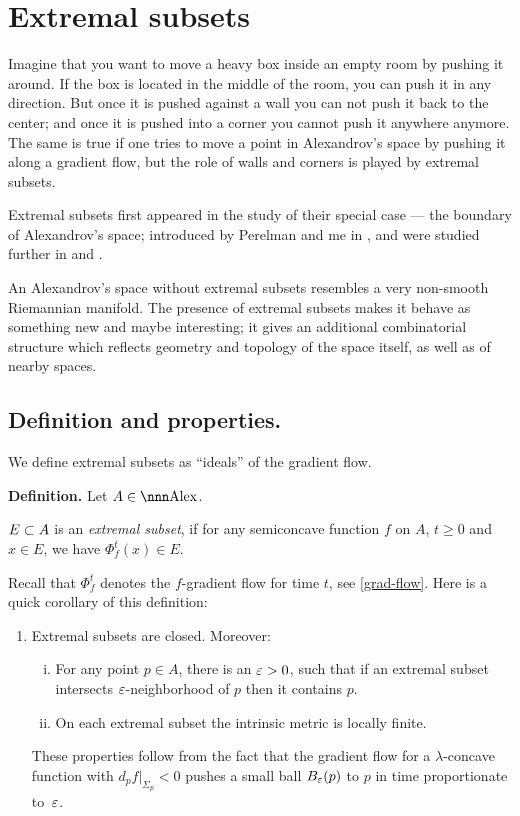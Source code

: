 \documentclass{article}
\begin{document}
\section{Extremal subsets}\label{extremal}

Imagine that you want to move a heavy box inside an empty room by pushing it around. 
If the box is located in the middle of the room, you  can push it in any direction. 
But once it is pushed against a wall you can not push it back to the center;
and once it is pushed into a corner you cannot push it anywhere anymore. 
The same is true if one tries to move a point in Alexandrov's space by pushing
it along a gradient flow, but the role of walls and corners is played by  extremal
subsets.

Extremal subsets first appeared in the study of their special case --- the boundary of Alexandrov's space; 
introduced by Perelman and me in \cite{perelman-petrunin:extremal}, 
and
were studied further in \cite{petrunin:extremal}
and \cite{perelman:collapsing}.

An Alexandrov's space without extremal subsets resembles a very non-smooth Riemannian manifold.
The presence of extremal subsets makes it behave as something new and maybe
interesting; it gives an additional combinatorial structure which
reflects geometry and topology of the space itself, as well as of nearby spaces.








\subsection{Definition and properties.}

We define extremal subsets as ``ideals'' of the gradient flow. 

\begin{thm}{\bf Definition.}\label{def:extrim} Let $A\in \Alex$.

$E\subset A$ is an \emph{extremal subset}, if for any semiconcave function
$f$ on $A$, $t\ge 0$ and $x\in E$, we have $\Phi_f^t(x)\in E$.
\end{thm}

Recall that $\Phi^t_f$ denotes the $f$-gradient flow for time $t$, see
\ref{grad-flow}.
Here is a quick corollary of this definition:
\begin{enumerate}
\item Extremal subsets are closed. Moreover:
\begin{enumerate}[(i)]
\item For any point $p\in A$, there is an $\varepsilon>0$, such that if an extremal subset
intersects $\varepsilon$-neighborhood of $p$ then it contains $p$.

\item On each extremal subset the intrinsic metric is locally finite.
\end{enumerate}
\setcounter{extr-prop}{\value{enumi}}
These properties follow from the fact that the gradient flow for a $\lambda$-concave
function with $d_p f|_{\Sigma_p}<0$ pushes a small ball $B_\varepsilon(p)$ to $p$ in time
proportionate to~$\varepsilon$.
\end{enumerate}
\end{document}
